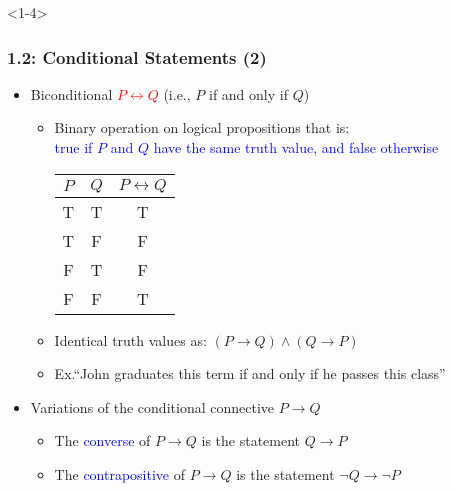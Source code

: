 \documentclass[10pt,english,aspectratio=169]{beamer}
\begin{document}
\begin{frame}<1-4> \frametitle{1.2: Conditional Statements (2)}

\begin{itemize}

\item<1-> Biconditional \textcolor{red}{$P \leftrightarrow Q$} (i.e., $P$ if and only if $Q$)

\begin{itemize}
  \setlength\itemsep{1.5mm}
  \item Binary operation on logical propositions that is:\\ \hspace{2mm} \textcolor{blue}{true if $P$ and $Q$ have the same truth value, and false otherwise} \vspace{1mm} \\
   
  \begin{center}
  \begin{tabular}{|c|c|c|}
  \hline
  $P$ & $Q$ & $P \leftrightarrow Q$ \\
  \hline
  T & T & T \\
  T & F & F \\
  F & T & F \\
  F & F & T \\
  \hline
  \end{tabular}
  \end{center} 
  \vspace{1mm}

  \item<2-> Identical truth values as: $(P \rightarrow Q) \wedge (Q \rightarrow P)$
  
  \item<3-> Ex.``John graduates this term if and only if he passes this class''
  
\end{itemize}

\vspace{1mm}

\item<4-> Variations of the conditional connective $P \rightarrow Q$

\begin{itemize}
  \setlength\itemsep{2mm}
  \item The \textcolor{blue}{converse} of $P \rightarrow Q$ is the statement $Q \rightarrow P$
  \item The \textcolor{blue}{contrapositive} of $P \rightarrow Q$ is the statement $\neg Q \rightarrow \neg P$
\end{itemize}


\end{itemize}
\end{frame}
\end{document}
